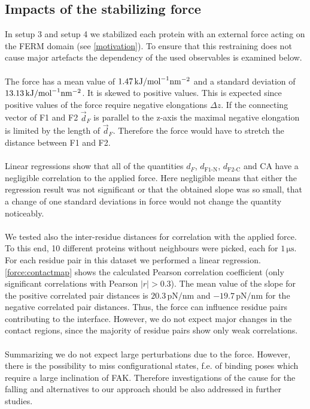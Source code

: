 \subsection{Impacts of the stabilizing force}
\label{forceana}
In setup 3 and setup 4 we stabilized each protein with an external force acting on the FERM domain (see \autoref{motivation}). To ensure that this restraining does not cause major artefacts the dependency of the used observables is examined below.\\
\\
The force has a mean value of $1.47\,\forceunit$ and a standard deviation of $13.13\,\forceunit$. It is skewed to positive values. This is expected since positive values of the force require negative elongations $\Delta z$. If the connecting vector of F1 and F2 $\vec{d}_F$ is parallel to the z-axis the maximal negative elongation is limited by the length of $\vec{d}_F$. Therefore the force would have to stretch the distance between F1 and F2.\\ %
\\
Linear regressions show that all of the quantities $d_F$, $d_\text{F1-N}$, $d_\text{F2-C}$ and CA have a negligible correlation to the applied force. Here negligible means that either the regression result was not significant or that the obtained slope was so small, that a change of one standard deviations in force would not change the quantity noticeably.\\
\\
We tested also the inter-residue distances for correlation with the applied force. To this end, 10 different proteins without neighbours were picked, each for $1\,\si{\micro\second}$. For each residue pair in this dataset we performed a linear regression. \autoref{force:contactmap} shows the calculated Pearson correlation coefficient (only significant correlations with Pearson $\left|r\right| > 0.3$). The mean value of the slope for the positive correlated pair distances is $20.3\,\si{\pico\newton/\nano\metre}$ and $-19.7\,\si{\pico\newton/\nano\metre}$ for the negative correlated pair distances. Thus, the force can influence residue pairs contributing to the interface. However, we do not expect major changes in the contact regions, since the majority of residue pairs show only weak correlations.\\
\\
Summarizing we do not expect large perturbations due to the force. However, there is the possibility to miss configurational states, f.e. of binding poses which require a large inclination of FAK. Therefore investigations of the cause for the falling and alternatives to our approach should be also addressed in further studies.
